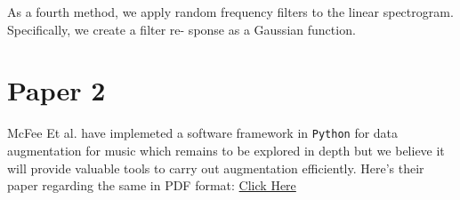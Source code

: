 As a fourth method, we apply random frequency filters to the linear spectrogram. Specifically, we create a filter re- sponse as a Gaussian function.



\section{Paper 2}
 
McFee Et al. have implemeted a software framework in \texttt{Python} for data augmentation for music which remains to be explored in depth but we believe it will provide valuable tools to carry out augmentation efficiently. Here's their paper regarding the same in PDF format: \href{https://bmcfee.github.io/papers/ismir2015_augmentation.pdf}{Click Here}